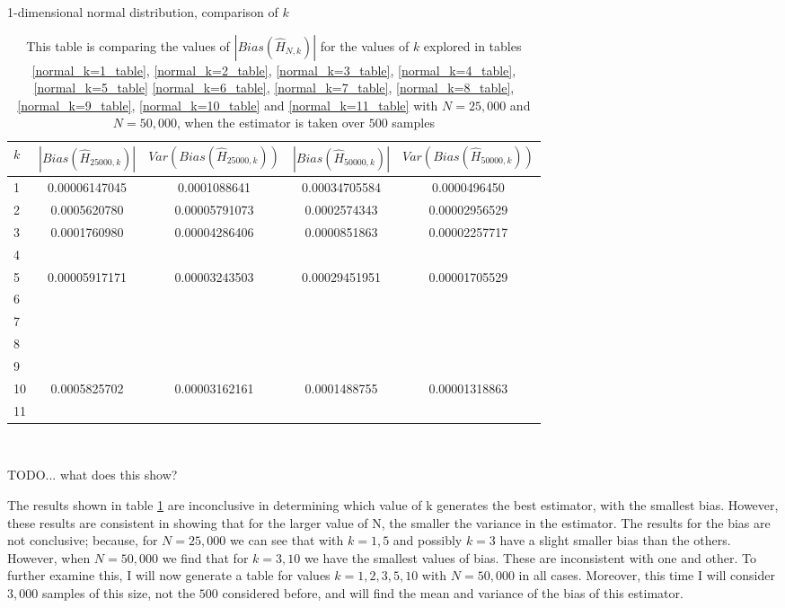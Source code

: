 \documentclass{article}
\begin{document}
\begin{table}
\caption{1-dimensional normal distribution, comparison of $k$} \label{normal_kcompare_table}
\begin{center}
\begin{tabular}{| l | c c c c|} 
\toprule
$k$ & $|Bias(\hat{H}_{25000, k})|$ & $Var(Bias(\hat{H}_{25000, k}))$ & $|Bias(\hat{H}_{50000, k})|$ & $Var(Bias(\hat{H}_{50000, k}) )$ \\
\midrule[1pt]
1    & 0.00006147045   & 0.0001088641     & 0.00034705584   & 0.0000496450   \\
2    & 0.0005620780     & 0.00005791073   & 0.0002574343     & 0.00002956529 \\
3    & 0.0001760980     & 0.00004286406   & 0.0000851863     & 0.00002257717 \\
4    &   &   &   &   \\
5    & 0.00005917171   & 0.00003243503   & 0.00029451951   & 0.00001705529 \\
6    &   &   &   &   \\
7    &   &   &   &   \\
8    &   &   &   &   \\
9    &   &   &   &   \\
10  & 0.0005825702     & 0.00003162161   & 0.0001488755     & 0.00001318863 \\
11  &   &   &   &   \\
\hline
\end{tabular}
\\[10pt]
\caption*{This table is comparing the values of $|Bias(\hat{H}_{N, k})|$ for the values of $k$ explored in tables \ref{normal_k=1_table}, \ref{normal_k=2_table}, \ref{normal_k=3_table}, \ref{normal_k=4_table}, \ref{normal_k=5_table}  \ref{normal_k=6_table}, \ref{normal_k=7_table}, \ref{normal_k=8_table}, \ref{normal_k=9_table}, \ref{normal_k=10_table} and  \ref{normal_k=11_table} with $N=25,000$ and $N=50,000$, when the estimator is taken over $500$ samples}
\end{center}
\end{table}

TODO... what does this show?

The results shown in table \ref{normal_kcompare_table} are inconclusive in determining which value of k generates the best estimator, with the smallest bias. However, these results are consistent in showing that for the larger value of N, the smaller the variance in the estimator. The results for the bias are not conclusive; because, for $N=25,000$ we can see that with $k=1, 5$ and possibly $k=3$ have a slight smaller bias than the others. However, when $N=50,000$ we find that for $k=3, 10$ we have the smallest values of bias. These are inconsistent with one and other. To further examine this, I will now generate a table for values $k=1, 2, 3, 5, 10$ with $N=50,000$ in all cases. Moreover, this time I will consider $3,000$ samples of this size, not the $500$ considered before, and will find the mean and variance of the bias of this estimator.
\end{document}
